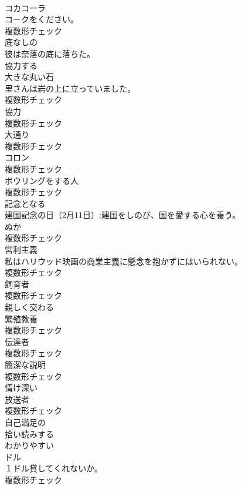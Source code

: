 \documentclass[8pt]{extreport}
\begin{document}
\begin{CJK}{UTF8}{min}
\\	[名詞]	コカコーラ	
\\	コークをください。	
\\	複数形チェック
\\	[形容詞]	底なしの	
\\	彼は奈落の底に落ちた。	
\\	[動詞]	協力する	
\\	[名詞]	大きな丸い石	
\\	里さんは岩の上に立っていました。	
\\	複数形チェック
\\	[名詞]	協力	
\\	複数形チェック
\\	[名詞]	大通り	
\\	複数形チェック
\\	[名詞]	コロン	
\\	複数形チェック
\\	[名詞]	ボウリングをする人	
\\	複数形チェック
\\	[動詞]	記念となる	
\\	建国記念の日（2月11日）:建国をしのび、国を愛する心を養う。	
\\	[名詞]	ぬか	
\\	複数形チェック
\\	[名詞]	営利主義	
\\	私はハリウッド映画の商業主義に懸念を抱かずにはいられない。	
\\	複数形チェック
\\	[名詞]	飼育者	
\\	複数形チェック
\\	[動詞]	親しく交わる	
\\	[名詞]	繁殖教養	
\\	複数形チェック
\\	[名詞]	伝達者	
\\	複数形チェック
\\	[名詞]	簡潔な説明	
\\	複数形チェック
\\	[形容詞]	情け深い	
\\	[名詞]	放送者	
\\	複数形チェック
\\	[形容詞]	自己満足の	
\\	[動詞]	拾い読みする	
\\	[形容詞]	わかりやすい	
\\	[名詞]	ドル	
\\	１ドル貸してくれないか。	
\\	複数形チェック

\end{CJK}
\end{document}
